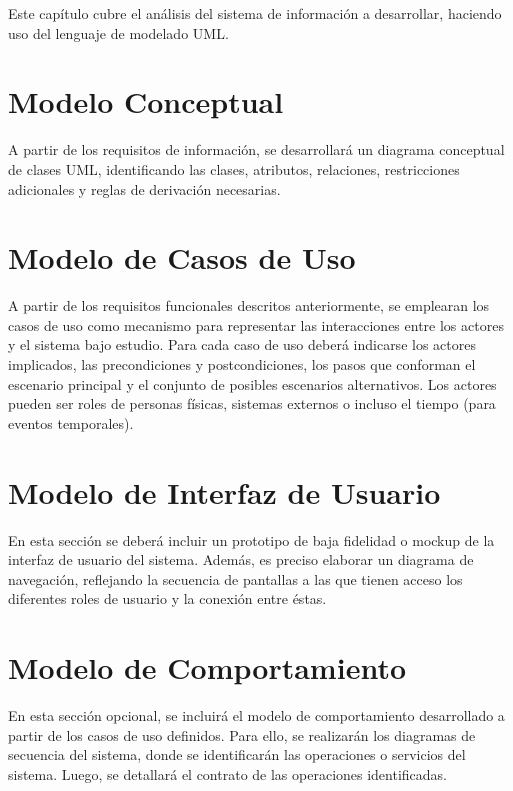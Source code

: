Este capítulo cubre el análisis del sistema de información a desarrollar, haciendo uso del lenguaje de modelado UML.

\section{Modelo Conceptual}
A partir de los requisitos de información, se desarrollará un diagrama conceptual de clases UML, identificando las clases, atributos, relaciones, restricciones adicionales y reglas de derivación necesarias.

\section{Modelo de Casos de Uso}
A partir de los requisitos funcionales descritos anteriormente, se emplearan los casos de uso como mecanismo para representar las interacciones entre los actores y el sistema bajo estudio. Para cada caso de uso deberá indicarse los actores implicados, las precondiciones y postcondiciones, los pasos que conforman el escenario principal y el conjunto de posibles escenarios alternativos. Los actores pueden ser roles de personas físicas, sistemas externos o incluso el tiempo (para eventos temporales).

\section{Modelo de Interfaz de Usuario}
En esta sección se deberá incluir un prototipo de baja fidelidad o mockup de la interfaz de usuario del sistema. Además, es preciso elaborar un diagrama de navegación, reflejando la secuencia de pantallas a las que tienen acceso los diferentes roles de usuario y la conexión entre éstas.

\section{Modelo de Comportamiento}
En esta sección opcional, se incluirá el modelo de comportamiento desarrollado a partir de los casos de uso definidos. Para ello, se realizarán los diagramas de secuencia del sistema, donde se identificarán las operaciones o servicios del sistema. Luego, se detallará el contrato de las operaciones identificadas.
